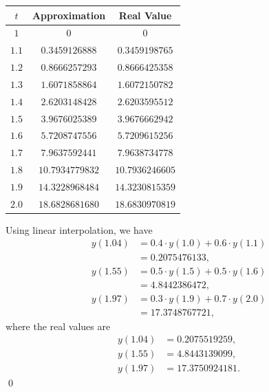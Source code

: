 \documentclass[11pt]{article}
\theoremstyle{break}
\numberwithin{equation}{theorem}
\begin{document}
\begin{enumerate}
\begin{center}
\begin{tabular}{|c|c|c|}
            \hline
            $t$ & Approximation & Real Value \\
            \hline
            $1$ & $0$ & $0$ \\
            \hline
            $1.1$ & $0.3459126888$ & $0.3459198765$ \\
            \hline
            $1.2$ & $0.8666257293$ & $0.8666425358$ \\
            \hline
            $1.3$ & $1.6071858864$ & $1.6072150782$ \\
            \hline
            $1.4$ & $2.6203148428$ & $2.6203595512$ \\
            \hline
            $1.5$ & $3.9676025389$ & $3.9676662942$ \\
            \hline
            $1.6$ & $5.7208747556$ & $5.7209615256$ \\
            \hline
            $1.7$ & $7.9637592441$ & $7.9638734778$ \\
            \hline
            $1.8$ & $10.7934779832$ & $10.7936246605$ \\
            \hline
            $1.9$ & $14.3228968484$ & $14.3230815359$ \\
            \hline
            $2.0$ & $18.6828681680$ & $18.6830970819$ \\
            \hline
        \end{tabular}
    \end{center}
    Using linear interpolation, we have 
    \begin{align*}
        y(1.04)&=0.4\cdot y(1.0)+0.6\cdot y(1.1)\\
        &=0.2075476133,\\
        y(1.55)&=0.5\cdot y(1.5)+0.5\cdot y(1.6)\\
        &=4.8442386472,\\
        y(1.97)&=0.3\cdot y(1.9)+0.7\cdot y(2.0)\\
        &=17.3748767721,
    \end{align*}
    where the real values are
    \begin{align*}
        y(1.04)&=0.2075519259,\\
        y(1.55)&=4.8443139099,\\
        y(1.97)&=17.3750924181.
    \end{align*} \qed
\end{enumerate}
\end{document}
